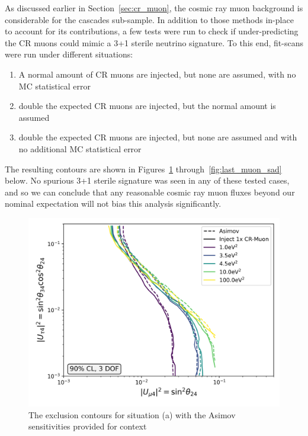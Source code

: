 \documentclass[main.tex]{subfiles}
\begin{document}
As discussed earlier in Section~\ref{sec:cr_muon}, the cosmic ray muon background is considerable for the cascades sub-sample. 
In addition to those methods in-place to account for its contributions, a few tests were run to check if under-predicting the CR muons could mimic a 3+1 sterile neutrino signature. 
To this end, fit-scans were run under different situations:
\begin{enumerate}[label=(\alph*)]
    \item A normal amount of CR muons are injected, but none are assumed, with no MC statistical error 
    \item double the expected CR muons are injected, but the normal amount is assumed 
    \item double the expected CR muons are injected, but none are assumed and with no additional MC statistical error 
\end{enumerate}
The resulting contours are shown in Figures~\ref{fig:first_muon_sad} through~\ref{fig:last_muon_sad} below. 
No spurious 3+1 sterile signature was seen in any of these tested cases, and so we can conclude that any reasonable cosmic ray muon fluxes beyond our nominal expectation will not bias this analysis significantly.

\begin{figure}
    \centering
    \includegraphics[width=0.7\linewidth]{figures/double_muon_mismodel_worse_Realization_Asimov_sterile_0_cl0.9_dof3.png}
    \caption{The exclusion contours for situation (a) with the Asimov sensitivities provided for context}\label{fig:first_muon_sad}
\end{figure}  
\end{document}
